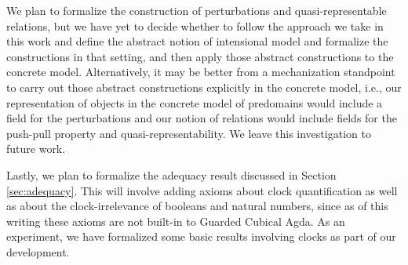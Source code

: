 We plan to formalize the construction of perturbations and 
quasi-representable relations, but we have yet to decide
whether to follow the approach we take in this work and define
the abstract notion of intensional model and formalize the constructions in that setting,
and then apply those abstract constructions to the concrete model.
Alternatively, it may be better from a mechanization standpoint
to carry out those abstract constructions explicitly in the concrete model,
i.e., our representation of objects in the concrete model of predomains
would include a field for the perturbations and our notion of relations
would include fields for the push-pull property and quasi-representability.
We leave this investigation to future work.

Lastly, we plan to formalize the adequacy result discussed in
Section \ref{sec:adequacy}. This will involve adding axioms about
clock quantification as well as about the clock-irrelevance of
booleans and natural numbers, since as of this writing these
axioms are not built-in to Guarded Cubical Agda. As an experiment, we have 
formalized some basic results involving clocks as part of our development.

